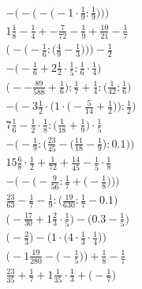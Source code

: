 \documentclass[8pt]{article}
\begin{document}
\begin{align}
-\bigg(-\Big(-\big(-1 \cdot \frac{1}{9} : \frac{1}{9}\big)\Big)\bigg) \\
1\frac{1}{8} - \frac{1}{4} + -\frac{7}{72} - \frac{1}{9} + \frac{10}{21} - \frac{1}{7} \\
\bigg(-\Big(-\frac{1}{6} : \big(\frac{4}{9} - \frac{1}{3}\big)\Big)\bigg) - \frac{1}{2} \\
-\big(-\frac{1}{6} + 2\frac{1}{2} \cdot \frac{1}{5} : \frac{1}{6} \cdot \frac{1}{4}\big) \\
\big(--\frac{89}{588} + \frac{1}{6}\big) : \frac{1}{7} + \frac{1}{4} : \big(\frac{1}{42} : \frac{1}{6}\big) \\
-\bigg(-3\frac{1}{2} \cdot \Big(1 \cdot \big(-\frac{5}{14} + \frac{1}{2}\big)\Big) : \frac{1}{2}\bigg) \\
7\frac{1}{6} - \frac{1}{2} \cdot \frac{1}{8} : \big(\frac{1}{18} + \frac{1}{9}\big) \cdot \frac{1}{5} \\
-\bigg(-\frac{1}{9} : \Big(\frac{23}{45} - \big(\frac{11}{18} - \frac{1}{9}\big) : 0.1\Big)\bigg) \\
15\frac{6}{8} \cdot \frac{1}{2} + \frac{1}{72} + \frac{14}{45} - \frac{1}{5} \cdot \frac{1}{8} \\
-\bigg(-\Big(-\frac{9}{56} : \frac{1}{7} + \big(-\frac{1}{8}\big)\Big)\bigg) \\
\frac{23}{63} - \frac{1}{7} - \frac{1}{9} : \big(\frac{19}{630} : \frac{1}{7} - 0.1\big) \\
\big(-\frac{17}{30} + 1\frac{2}{3} \cdot \frac{1}{5}\big) - \big(0.3 - \frac{1}{5}\big) \\
\Big(-\frac{2}{3}\Big) - \Big(1 \cdot \big(4 \cdot \frac{1}{3} \cdot \frac{1}{4}\big)\Big) \\
\Big(-1\frac{19}{280} - \big(-\frac{1}{5}\big)\Big) + \frac{1}{8} - \frac{1}{7} \\
\frac{23}{35} + \frac{1}{7} + 1\frac{1}{35} \cdot \frac{1}{3} + \big(-\frac{1}{7}\big)
\end{align}
\end{document}
